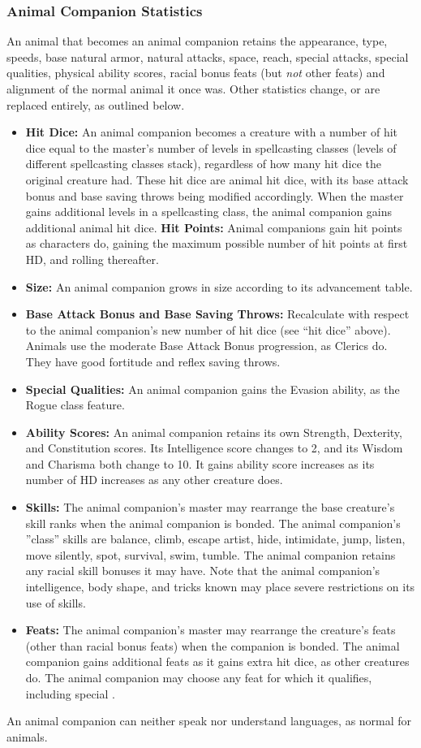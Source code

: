 \subsubsection{Animal Companion Statistics}
An animal that becomes an animal companion retains the appearance, type, speeds, base natural armor, natural attacks, space, reach, special attacks, special qualities, 
physical ability scores, racial bonus feats (but \emph{not} other feats) and alignment of the normal animal it once was. 
Other statistics change, or are replaced entirely, as outlined below.
\begin{itemize}
 \item \textbf{Hit Dice:} An animal companion becomes a creature with a number of hit dice equal to the master's number of levels in spellcasting classes 
 (levels of different spellcasting classes stack), 
 regardless of how many hit dice the original creature had. 
 These hit dice are animal hit dice, with its base attack bonus and base saving throws being modified accordingly.
 When the master gains additional levels in a spellcasting class, the animal companion gains additional animal hit dice. 
 \subitem \textbf{Hit Points:} Animal companions gain hit points as characters do, gaining the maximum possible number of hit points at first HD, 
 and rolling thereafter.
 \item \textbf{Size:} An animal companion grows in size according to its advancement table.
 \item \textbf{Base Attack Bonus and Base Saving Throws:} Recalculate with respect to the animal companion's new number of hit dice (see ``hit dice'' above). 
 Animals use the moderate Base Attack Bonus progression, as Clerics do. They have good fortitude and reflex saving throws.
 \item \textbf{Special Qualities:} An animal companion gains the Evasion ability, as the Rogue class feature.
 \item \textbf{Ability Scores:} An animal companion retains its own Strength, Dexterity, and Constitution scores. 
 Its Intelligence score changes to 2, and its Wisdom and Charisma both change to 10.
 It gains ability score increases as its number of HD increases as any other creature does.
 \item \textbf{Skills:} The animal companion's master may rearrange the base creature's skill ranks when the animal companion is bonded. 
 The animal companion's ''class'' skills are balance, climb, escape artist, hide, intimidate, jump, listen, move silently, spot, survival, swim, tumble. 
 The animal companion retains any racial skill bonuses it may have.
 Note that the animal companion's intelligence, body shape, and tricks known may place severe restrictions on its use of skills.
 \item \textbf{Feats:} The animal companion's master may rearrange the creature's feats (other than racial bonus feats) when the companion is bonded.
 The animal companion gains additional feats as it gains extra hit dice, as other creatures do. 
 The animal companion may choose any feat for which it qualifies, including special .
\end{itemize}
An animal companion can neither speak nor understand languages, as normal for animals.

